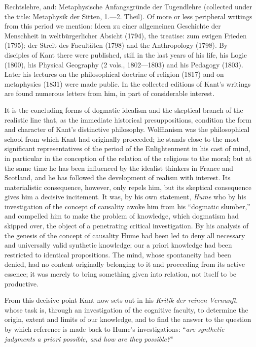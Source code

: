 Rechtslehre, and: Metaphysische Anfangsgründe der Tugendlehre
(collected under the title: Metaphysik der Sitten, 1.---2. Theil). Of
more or less peripheral writings from this period we mention: Ideen zu
einer allgemeinen Geschichte der Menschheit in weltbürgerlicher Absicht
(1794), the treatise: zum ewigen Frieden (1795); der Streit des
Facultäten (1798) and the Anthropology (1798). By disciples of Kant
there were published, still in the last years of his life, his Logic
(1800), his Physical Geography (2 vols., 1802---1803) and his Pedagogy
(1803). Later his lectures on the philosophical doctrine of religion
(1817) and on metaphysics (1831) were made public. In the collected
editions of Kant's writings are found numerous letters from him, in
part of considerable interest.

\divrule

It is the concluding forms of dogmatic idealism and the
skeptical branch of the realistic line that, as the immediate
historical presuppositions, condition the form and character of Kant's
distinctive philosophy. Wolffianism was the philosophical school from
which Kant had originally proceeded; he stands close to the most
significant representatives of the period of the Enlightenment in his
cast of mind, in particular in the conception of the relation of the
religious to the moral; but at the same time he has been influenced by
the idealist thinkers in France and Scotland, and he has followed the
development of realism with interest. Its materialistic consequence,
however, only repels him, but its skeptical consequence gives him a
decisive incitement. It was, by his own statement, \emph{Hume} who by
his investigation of the concept of causality awoke him from his
``dogmatic slumber,'' and compelled him to make the problem of
knowledge, which dogmatism had skipped over, the object of a
penetrating critical investigation. By his analysis of the genesis of
the concept of causality Hume had been led to deny all necessary and
universally valid synthetic knowledge; our a priori knowledge had been
restricted to identical propositions. The mind, whose spontaneity had
been denied, had no content originally belonging to it and proceeding
from its active essence; it was merely to bring something given into
relation, not itself to be productive.

From this decisive point Kant now sets out in his \emph{Kritik der
reinen Vernunft}, whose task is, through an investigation of the
cognitive faculty, to determine the origin, extent and limits of our
knowledge, and to find the answer to the question by which reference is
made back to Hume's investigations: ``\emph{are synthetic judgments a
priori possible, and how are they possible?}''

